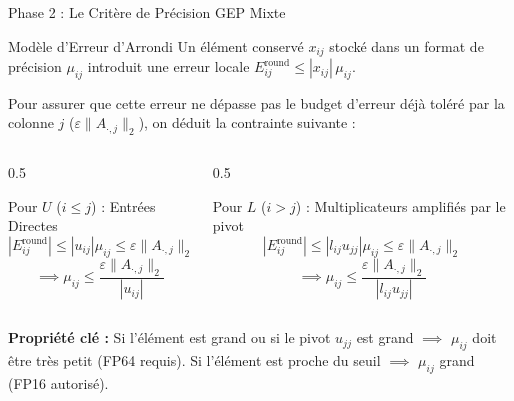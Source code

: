 \documentclass[10pt,aspectratio=169]{beamer}
\begin{document}
\begin{frame}{Phase 2 : Le Critère de Précision GEP Mixte}
    \begin{block}{Modèle d'Erreur d'Arrondi}
        Un élément conservé $x_{ij}$ stocké dans un format de précision $\mu_{ij}$ introduit une erreur locale $E_{ij}^{\text{round}} \le |x_{ij}|\,\mu_{ij}$.
    \end{block}
    
    Pour assurer que cette erreur ne dépasse pas le budget d'erreur déjà toléré par la colonne $j$ ($\varepsilon \|A_{\cdot,j}\|_2$), on déduit la contrainte suivante :
    
    \begin{columns}
        \begin{column}{0.5\textwidth}
            \begin{block}{Pour $U$ ($i \le j$) : Entrées Directes}
                $$|E_{ij}^{\text{round}}| \le |u_{ij}| \mu_{ij} \le \varepsilon \|A_{\cdot,j}\|_2$$
                $$\implies \mu_{ij} \le \frac{\varepsilon \|A_{\cdot,j}\|_2}{|u_{ij}|}$$
            \end{block}
        \end{column}
        
        \begin{column}{0.5\textwidth}
            \begin{block}{Pour $L$ ($i > j$) : Multiplicateurs amplifiés par le pivot}
                $$|E_{ij}^{\text{round}}| \le |l_{ij} u_{jj}| \mu_{ij} \le \varepsilon \|A_{\cdot,j}\|_2$$
                $$\implies \mu_{ij} \le \frac{\varepsilon \|A_{\cdot,j}\|_2}{|l_{ij} u_{jj}|}$$
            \end{block}
        \end{column}
    \end{columns}
    \vspace{0.3cm}
    \centering
    \textbf{Propriété clé :} Si l'élément est grand ou si le pivot $u_{jj}$ est grand $\implies$ $\mu_{ij}$ doit être très petit (FP64 requis). Si l'élément est proche du seuil $\implies$ $\mu_{ij}$ grand (FP16 autorisé).
\end{frame}
\end{document}
